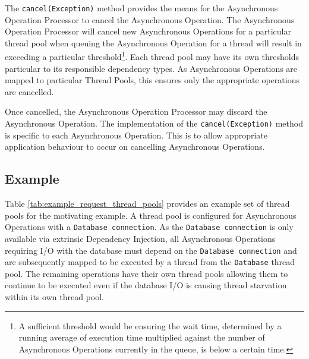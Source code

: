 \documentclass[prodmode]{style/acmlarge}
\begin{document}
The \texttt{cancel(Exception)} method provides the means for the Asynchronous
Operation Processor to cancel the Asynchronous Operation.  The Asynchronous
Operation Processor will cancel new Asynchronous Operations for a particular
thread pool when queuing the Asynchronous Operation for a thread will result in
exceeding a particular threshold\footnote{A sufficient threshold would be
ensuring the wait time, determined by a running average of execution time
multiplied against the number of Asynchronous Operations currently in the queue,
is below a certain time.}.  Each thread pool may have its own thresholds
particular to its responsible dependency types.  As Asynchronous Operations are
mapped to particular Thread Pools, this ensures only the appropriate operations
are cancelled.

Once cancelled, the Asynchronous Operation Processor may discard the
Asynchronous Operation.  The implementation of the \texttt{cancel(Exception)}
method is specific to each Asynchronous Operation.  This is to allow appropriate
application behaviour to occur on cancelling Asynchronous Operations.


\subsection{Example}

Table \ref{tab:example_request_thread_pools} provides an example set of thread
pools for the motivating example.  A thread pool is configured for Asynchronous
Operations with a \texttt{Database connection}.  As the \texttt{Database
connection} is only available via extrinsic Dependency Injection, all
Asynchronous Operations requiring I/O with the database must depend on the
\texttt{Database connection} and are subsequently mapped to be executed by a
thread from the \texttt{Database} thread pool.  The remaining operations have
their own thread pools allowing them to continue to be executed even if the
database I/O is causing thread starvation within its own thread pool.

\begin{table}[t]
\label{tab:example_request_thread_pools}
\end{table}
\end{document}
